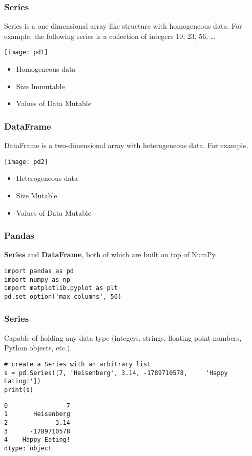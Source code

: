 \begin{frame}[fragile]\frametitle{Series}
Series is a one-dimensional array like structure with homogeneous data. For example, the following series is a collection of integers 10, 23, 56, \ldots
\begin{center}
\texttt{[image: pd1]}
\end{center}
\begin{itemize}
\item  Homogeneous data
\item  Size Immutable
\item    Values of Data Mutable
\end{itemize}
\end{frame}

\begin{frame}[fragile]\frametitle{DataFrame}
DataFrame is a two-dimensional array with heterogeneous data. For example,
\begin{center}
\texttt{[image: pd2]}
\end{center}
\begin{itemize}
\item  Heterogeneous  data
\item  Size Mutable
\item    Values of Data Mutable
\end{itemize}
\end{frame}


\begin{frame}[fragile]\frametitle{Pandas}	
\textbf{Series} and \textbf{DataFrame}, both of which are built on top of NumPy.
\begin{lstlisting}
import pandas as pd
import numpy as np
import matplotlib.pyplot as plt
pd.set_option('max_columns', 50)
\end{lstlisting}
\end{frame}

\begin{frame}[fragile]\frametitle{Series}
Capable of holding any data type (integers, strings, floating point numbers, Python objects, etc.). 

\begin{lstlisting}
# create a Series with an arbitrary list
s = pd.Series([7, 'Heisenberg', 3.14, -1789710578,     'Happy Eating!'])
print(s)
\end{lstlisting}

\begin{lstlisting}
0                7
1       Heisenberg
2             3.14
3      -1789710578
4    Happy Eating!
dtype: object
\end{lstlisting}
\end{frame}

